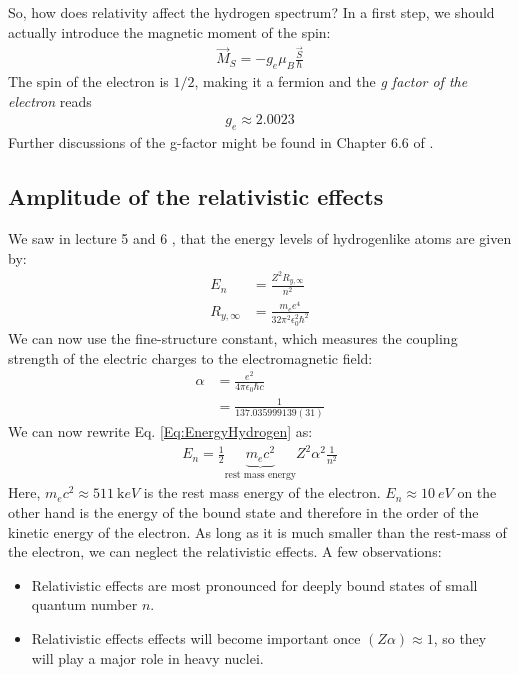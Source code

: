 \documentclass[10pt]{article}
\let\cite\citep
\providecommand\citep{\cite}
\begin{document}
So, how does relativity affect the hydrogen spectrum? In a first step, we should actually introduce the magnetic moment of the spin:
\begin{align}
\vec{M}_S = -g_e \mu_B \frac{\vec{S}}{\hbar}
\end{align}
The spin of the electron is $1/2$, making it a fermion and the \textit{g factor of the electron} reads 
\begin{align}
g_e \approx 2.0023
\end{align}
Further discussions of the g-factor might be found in Chapter 6.6 of \cite{Hertel_2015}.

\subsection{Amplitude of the relativistic effects}

We saw in lecture 5 \cite{Jendrzejewski} and 6 \cite{Jendrzejewskib}, that the energy levels of hydrogenlike atoms are given by:
\begin{align}\label{Eq:EnergyHydrogen}
E_n &= \frac{Z^2 R_{y,\infty}}{n^2}\\
R_{y,\infty} &= \frac{m_e e^4}{32 \pi^2 \epsilon_0^2 \hbar^2}
\end{align}
We can now use the fine-structure constant, which measures the coupling strength of the electric charges to the electromagnetic field:
\begin{align}\label{Eq:FS}
\alpha &= \frac{e^2}{4\pi\epsilon_0\hbar c}\\
&= \frac{1}{137.035999139(31)}
\end{align}
We can now rewrite Eq. \eqref{Eq:EnergyHydrogen} as:
\begin{align}
E_n = \frac{1}{2} \underbrace{m_e c^2}_{\text{rest mass energy}} Z^2 \alpha^2 \frac{1}{n^2}
\end{align}
Here, $m_e c^2\approx \SI{511}{\kilo eV}$ is the rest mass energy of the electron. $E_n \approx \SI{10}{eV}$ on the other hand is the energy of the bound state and therefore in the order of the kinetic energy of the electron. As long as it is much smaller than the rest-mass of the electron, we can neglect the relativistic effects. A few observations:

\begin{itemize}
\item Relativistic effects are most pronounced for deeply bound states of small quantum number $n$.
\item Relativistic effects effects will become important once $(Z\alpha)\approx 1$, so they will play a major role in heavy nuclei. 
\end{itemize}
\end{document}
